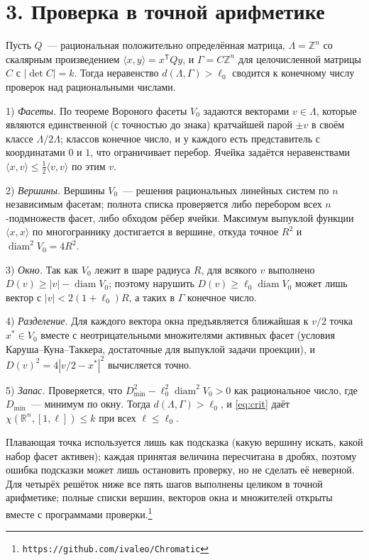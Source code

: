 \documentclass{article}
\theoremstyle{plain}
\theoremstyle{remark}
\newcommand{\R}{\mathbb{R}}
\newcommand{\Z}{\mathbb{Z}}
\newcommand{\diam}{\operatorname{diam}}
\begin{document}
\section*{3. Проверка в точной арифметике}

Пусть $Q$~--- рациональная положительно определённая матрица,
$\Lambda=\Z^n$ со скалярным произведением
$\langle x,y\rangle=x^{\mathsf T}Qy$, и $\Gamma=C\Z^n$ для целочисленной
матрицы $C$ с $|\det C|=k$. Тогда неравенство $d(\Lambda,\Gamma)>\ell_0$
сводится к конечному числу проверок над рациональными числами.

1) \emph{Фасеты.} По теореме Вороного фасеты $V_0$ задаются векторами
$v\in\Lambda$, которые являются единственной (с точностью до знака)
кратчайшей парой $\pm v$ в своём классе $\Lambda/2\Lambda$; классов конечное
число, и у каждого есть представитель с координатами $0$ и $1$, что
ограничивает перебор. Ячейка задаётся неравенствами
$\langle x,v\rangle\le\frac12\langle v,v\rangle$ по этим $v$.

2) \emph{Вершины.} Вершины $V_0$~--- решения рациональных линейных систем
по $n$ независимым фасетам; полнота списка проверяется либо перебором всех
$n$-подмножеств фасет, либо обходом рёбер ячейки. Максимум выпуклой функции
$\langle x,x\rangle$ по многограннику достигается в вершине, откуда точное
$R^2$ и $\diam^2V_0=4R^2$.

3) \emph{Окно.} Так как $V_0$ лежит в шаре радиуса $R$, для всякого $v$
выполнено $D(v)\ge|v|-\diam V_0$; поэтому нарушить $D(v)\ge\ell_0\diam V_0$
может лишь вектор с $|v|<2(1+\ell_0)R$, а таких в $\Gamma$ конечное число.

4) \emph{Разделение.} Для каждого вектора окна предъявляется ближайшая к
$v/2$ точка $x^*\in V_0$ вместе с неотрицательными множителями активных
фасет (условия Каруша--Куна--Таккера, достаточные для выпуклой задачи
проекции), и $D(v)^2=4|v/2-x^*|^2$ вычисляется точно.

5) \emph{Запас.} Проверяется, что $D_{\min}^2-\ell_0^2\diam^2V_0>0$ как
рациональное число, где $D_{\min}$~--- минимум по окну. Тогда
$d(\Lambda,\Gamma)>\ell_0$, и \eqref{eq:crit} даёт
$\chi(\R^n,[1,\ell])\le k$ при всех $\ell\le\ell_0$.

Плавающая точка используется лишь как подсказка (какую вершину искать,
какой набор фасет активен); каждая принятая величина пересчитана в дробях,
поэтому ошибка подсказки может лишь остановить проверку, но не сделать её
неверной. Для четырёх решёток ниже все пять шагов выполнены целиком в точной
арифметике; полные списки вершин, векторов окна и множителей открыты вместе
с программами проверки.\footnote{\texttt{https://github.com/ivaleo/Chromatic}}
\end{document}
